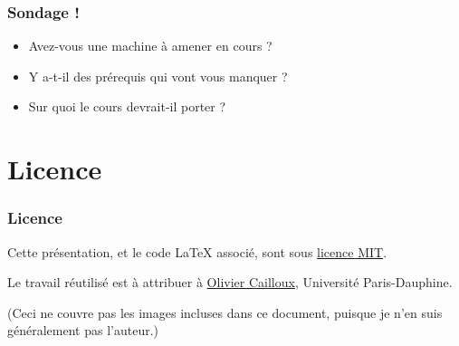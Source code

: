 \documentclass[english, french]{beamer}
\begin{document}
\begin{frame}
	\frametitle{Sondage !}
	\begin{itemize}
		\item Avez-vous une machine à amener en cours ?
		\item Y a-t-il des prérequis qui vont vous manquer ?
		\item Sur quoi le cours devrait-il porter ?
	\end{itemize}
\end{frame}

\appendix
\AtBeginSection{
}
\section{Licence}
\begin{frame}
	\frametitle{Licence}
	Cette présentation, et le code LaTeX associé, sont sous \href{http://opensource.org/licenses/MIT}{licence MIT}.
	
	Le travail réutilisé est à attribuer à \href{http://www.lamsade.dauphine.fr/~ocailloux/}{Olivier Cailloux}, Université Paris-Dauphine.
	
	\small{(Ceci ne couvre pas les images incluses dans ce document, puisque je n’en suis généralement pas l’auteur.)}
\end{frame}
\end{document}
